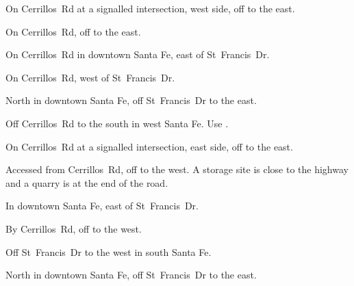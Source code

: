 
\begin{LocationList}

On Cerrillos~Rd at a signalled intersection, west side, off  to the east.

On Cerrillos~Rd, off  to the east.

On Cerrillos~Rd in downtown Santa Fe, east of  St~Francis~Dr.

\Location{\GarageHQ \Garage}
On Cerrillos~Rd, west of  St~Francis~Dr.

\Location{\GasStation \Gas}
North in downtown Santa Fe, off  St~Francis~Dr to the east.

Off Cerrillos~Rd to the south in west Santa Fe.
Use .

On Cerrillos~Rd at a signalled intersection, east side, off  to the east.

Accessed from Cerrillos~Rd, off  to the west.
A storage site is close to the highway and a quarry is at the end of the road.

\Location{\RecruitmentAgency \Recruitment}
In downtown Santa Fe, east of  St~Francis~Dr.

By Cerrillos~Rd, off  to the west.

\Location{\TruckService \Service}
Off  St~Francis~Dr to the west in south Santa Fe.

North in downtown Santa Fe, off  St~Francis~Dr to the east.

\end{LocationList}

